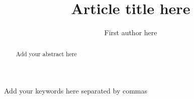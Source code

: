 \documentclass{JASSS}
\title{Article title here}
\author[1]{First author here}
\affil[1]{Affiliation of the first author here}
\begin{document}
\maketitle 



\begin{abstract}
Add your abstract here
\end{abstract}

\begin{keywords}
Add your keywords here separated by commas
\end{keywords}

\parano{}






\end{document}
